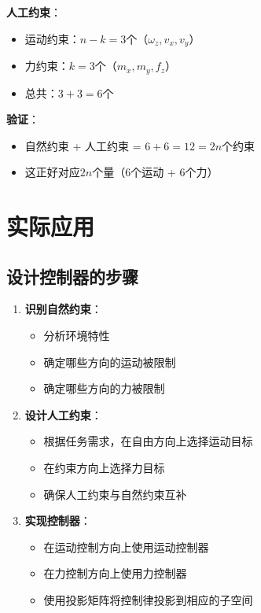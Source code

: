 \documentclass[12pt,a4paper]{article}
\begin{document}
\textbf{人工约束}：
\begin{itemize}
\item 运动约束：$n-k = 3$个（$\omega_z, v_x, v_y$）
\item 力约束：$k = 3$个（$m_x, m_y, f_z$）
\item 总共：$3 + 3 = 6$个
\end{itemize}

\textbf{验证}：
\begin{itemize}
\item 自然约束 + 人工约束 = $6 + 6 = 12 = 2n$个约束
\item 这正好对应$2n$个量（$6$个运动 + $6$个力）
\end{itemize}

\section{实际应用}

\subsection{设计控制器的步骤}

\begin{enumerate}
\item \textbf{识别自然约束}：
\begin{itemize}
\item 分析环境特性
\item 确定哪些方向的运动被限制
\item 确定哪些方向的力被限制
\end{itemize}

\item \textbf{设计人工约束}：
\begin{itemize}
\item 根据任务需求，在自由方向上选择运动目标
\item 在约束方向上选择力目标
\item 确保人工约束与自然约束互补
\end{itemize}

\item \textbf{实现控制器}：
\begin{itemize}
\item 在运动控制方向上使用运动控制器
\item 在力控制方向上使用力控制器
\item 使用投影矩阵将控制律投影到相应的子空间
\end{itemize}
\end{enumerate}
\end{document}
